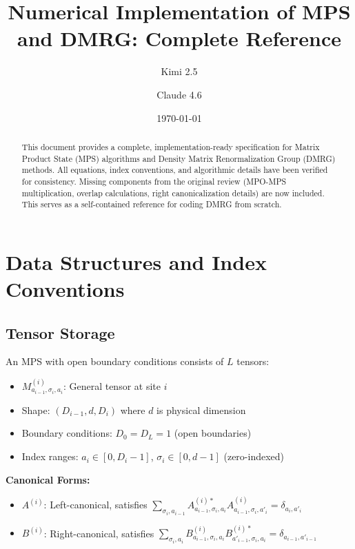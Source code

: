 \documentclass[aps,prb,onecolumn,scriptaddress]{revtex4-2}
\begin{document}
	
	\title{Numerical Implementation of MPS and DMRG: Complete Reference}
	\author{Kimi 2.5}
	\author{Claude 4.6}
	\date{\today}
	
	\begin{abstract}
		This document provides a complete, implementation-ready specification for Matrix Product State (MPS) algorithms and Density Matrix Renormalization Group (DMRG) methods. All equations, index conventions, and algorithmic details have been verified for consistency. Missing components from the original review (MPO-MPS multiplication, overlap calculations, right canonicalization details) are now included. This serves as a self-contained reference for coding DMRG from scratch.
	\end{abstract}
	
	\maketitle
	
	\tableofcontents
	
	\section{Data Structures and Index Conventions}
	
	\subsection{Tensor Storage}
	
	An MPS with open boundary conditions consists of $L$ tensors:
	\begin{itemize}
		\item $M^{(i)}_{a_{i-1},\sigma_i,a_i}$: General tensor at site $i$
		\item Shape: $(D_{i-1}, d, D_i)$ where $d$ is physical dimension
		\item Boundary conditions: $D_0 = D_L = 1$ (open boundaries)
		\item Index ranges: $a_i \in [0, D_i-1]$, $\sigma_i \in [0, d-1]$ (zero-indexed)
	\end{itemize}
	
	\textbf{Canonical Forms:}
	\begin{itemize}
		\item $A^{(i)}$: Left-canonical, satisfies $\sum_{\sigma_i, a_{i-1}} A^{(i)*}_{a_{i-1},\sigma_i,a_i} A^{(i)}_{a_{i-1},\sigma_i,a'_i} = \delta_{a_i,a'_i}$
		\item $B^{(i)}$: Right-canonical, satisfies $\sum_{\sigma_i, a_i} B^{(i)}_{a_{i-1},\sigma_i,a_i} B^{(i)*}_{a'_{i-1},\sigma_i,a_i} = \delta_{a_{i-1},a'_{i-1}}$
	\end{itemize}
	
\end{document}

